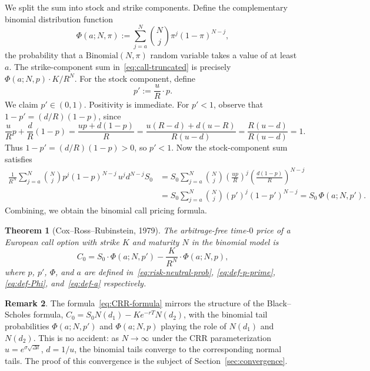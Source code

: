 \documentclass[11pt,a4paper]{article}
\theoremstyle{plain}
\newtheorem{theorem}{Theorem}[section]
\theoremstyle{definition}
\newtheorem{remark}[theorem]{Remark}
\begin{document}
We split the sum into stock and strike components. Define the
complementary binomial distribution function
\begin{equation}
    \label{eq:def-Phi}
    \Phi(a; N, \pi) := \sum_{j=a}^{N} \binom{N}{j} \pi^j (1-\pi)^{N-j},
\end{equation}
the probability that a $\mathrm{Binomial}(N, \pi)$ random variable takes
a value of at least $a$. The strike-component sum
in~\eqref{eq:call-truncated} is precisely $\Phi(a; N, p) \cdot K / R^N$.
For the stock component, define
\begin{equation}
    \label{eq:def-p-prime}
    p' := \frac{u}{R} \cdot p.
\end{equation}
We claim $p' \in (0,1)$. Positivity is immediate. For $p' < 1$, observe
that $1 - p' = (d/R)(1-p)$, since
\[
\frac{u}{R} p + \frac{d}{R}(1-p)
= \frac{up + d(1-p)}{R}
= \frac{u(R-d) + d(u-R)}{R(u-d)}
= \frac{R(u-d)}{R(u-d)} = 1.
\]
Thus $1 - p' = (d/R)(1-p) > 0$, so $p' < 1$. Now the stock-component sum
satisfies
\begin{align*}
\frac{1}{R^N} \sum_{j=a}^{N} \binom{N}{j} p^j (1-p)^{N-j}\, u^j d^{N-j} S_0
&= S_0 \sum_{j=a}^{N} \binom{N}{j} \left(\frac{up}{R}\right)^j
        \left(\frac{d(1-p)}{R}\right)^{N-j} \\
&= S_0 \sum_{j=a}^{N} \binom{N}{j} (p')^j (1-p')^{N-j}
= S_0 \, \Phi(a; N, p').
\end{align*}
Combining, we obtain the binomial call pricing formula.

\begin{theorem}[Cox--Ross--Rubinstein, 1979]
\label{thm:CRR-formula}
The arbitrage-free time-$0$ price of a European call option with strike
$K$ and maturity $N$ in the binomial model is
\begin{equation}
    \label{eq:CRR-formula}
    C_0 = S_0 \cdot \Phi(a; N, p') - \frac{K}{R^N} \cdot \Phi(a; N, p),
\end{equation}
where $p$, $p'$, $\Phi$, and $a$ are defined
in~\eqref{eq:risk-neutral-prob}, \eqref{eq:def-p-prime},
\eqref{eq:def-Phi}, and~\eqref{eq:def-a} respectively.
\end{theorem}

\begin{remark}
The formula~\eqref{eq:CRR-formula} mirrors the structure of the
Black--Scholes formula, $C_0 = S_0 N(d_1) - K e^{-rT} N(d_2)$, with the
binomial tail probabilities $\Phi(a; N, p')$ and $\Phi(a; N, p)$
playing the role of $N(d_1)$ and $N(d_2)$. This is no accident: as
$N \to \infty$ under the CRR parameterization
$u = e^{\sigma \sqrt{\Delta t}}$, $d = 1/u$, the binomial tails converge
to the corresponding normal tails. The proof of this convergence is the
subject of Section~\ref{sec:convergence}.
\end{remark}
\end{document}
